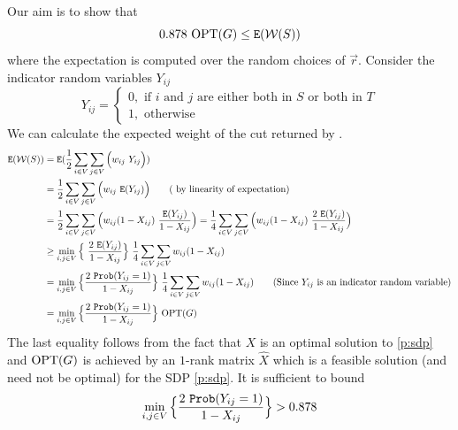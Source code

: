 \documentclass[12pt,
    driverfallback=dvipdfm,
 	openany,
    a4paper,
    toc=bibliography,
    twoside,
    numbers=noenddot]{article}              %
\begin{document}
Our aim is to show that
\[0.878 ~\mathrm{OPT}(G) \leq \mathtt{E}(\mathcal{W}(S)) \]
where the expectation is computed over the random choices of $\vec r$. Consider the indicator random variables $Y_{ij}$
\[
Y_{ij} = \begin{cases}
0, \text{ if $i$ and $j$ are either both in $S$ or both in $T$}  \\
1, \text{ otherwise} 
\end{cases}
\]
We can calculate the expected weight of the cut returned by \A.
\begin{align*}
\Exp{\mathcal{W}(S)} & = \Exp{\frac{1}{2} \sum_{i \in V} \sum_{j \in V} \Big(w_{ij} ~Y_{ij} \Big) } \\
& = \frac{1}{2} \sum_{i \in V} \sum_{j \in V} \Big(w_{ij} ~\Exp{Y_{ij}} \Big) \tag{ by linearity of expectation} \\
& = \frac{1}{2} \sum_{i \in V} \sum_{j \in V} \Big(w_{ij} (1-X_{ij}) ~\frac{\Exp{Y_{ij}}}{1-X_{ij}} \Big) 
 = \frac{1}{4} \sum_{i \in V} \sum_{j \in V} \Big(w_{ij} (1-X_{ij}) ~\frac{2 ~\Exp{Y_{ij}}}{1-X_{ij}} \Big) \\
& \geq \min_{i,j \in V} \Big\{~\frac{2 ~\Exp{Y_{ij}}}{1-X_{ij}} \Big\} ~\frac{1}{4} \sum_{i \in V} \sum_{j \in V} w_{ij} (1-X_{ij}) \\
& = \min_{i,j \in V} \Big\{\frac{2 ~\Prob{Y_{ij} = 1}}{1-X_{ij}} \Big\} ~\frac{1}{4} \sum_{i \in V} \sum_{j \in V} w_{ij} (1-X_{ij}) \tag{Since $Y_{ij}$ is an indicator random variable} \\
& = \min_{i,j \in V} \Big\{\frac{2 ~\Prob{Y_{ij} = 1}}{1-X_{ij}} \Big\}  ~\opt(G) 
\end{align*} 
The last equality follows from the fact that $X$ is an optimal solution to \ref{p:sdp} and $\mathrm{OPT}(G)$ is achieved by an $1$-rank matrix $\hat X$ which is a feasible solution (and need not be optimal) for the SDP \ref{p:sdp}. 
It is sufficient to bound 
\[ \min_{i,j \in V} \Big\{\frac{2~\mathtt{Prob}(Y_{ij} = 1)}{1-X_{ij}}\Big\} > 0.878 \]
\end{document}
